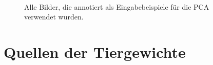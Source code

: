 \begin{figure}
~


\caption{Alle Bilder, die annotiert als Eingabebeispiele für die PCA verwendet wurden.}
\label{all_images}
\end{figure}

\clearpage
\section{Quellen der Tiergewichte}
\label{appendix_pca_weight}
 

